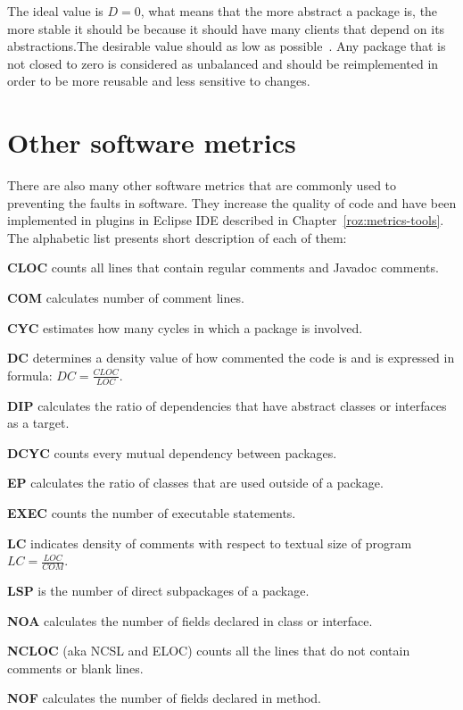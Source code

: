 The ideal value is $D=0$, what means that the more abstract a package is, the more stable it should be because it should have many clients that depend on its abstractions.The desirable value should as low as possible~\cite{martin}. Any package that is not closed to zero is considered as unbalanced and should be reimplemented in order to be more reusable and less sensitive to changes.

\section{Other software metrics}
\label{sec:other-metrics}
There are also many other software metrics that are commonly used to preventing the faults in software. They increase the quality of code and have been implemented in plugins in Eclipse IDE described in Chapter~\ref{roz:metrics-tools}. The alphabetic list presents short description of each of them:  

\textbf{\ac{CLOC}} counts all lines that contain regular comments and Javadoc comments.

\textbf{\ac{COM}} calculates number of comment lines. 

\textbf{\ac{CYC}} estimates how many cycles in which a package is involved.

\textbf{\ac{DC}} determines a density value of how commented the code is and is expressed in formula: $DC = \frac{CLOC}{LOC}$.

\textbf{\ac{DIP}}  calculates the ratio of dependencies that have abstract classes or interfaces as a target.

\textbf{\ac{DCYC}} counts every mutual dependency between packages.

\textbf{\ac{EP}}  calculates the ratio of classes that are used outside of a package.

\textbf{\ac{EXEC}} counts the number of executable statements.	

\textbf{\ac{LC}} indicates density of comments with respect to textual size of program $LC=\frac {LOC}{COM}$.

\textbf{\ac{LSP}} is the number of direct subpackages of a package.

\textbf{\ac{NOA}}  calculates the number of fields declared in class or interface.

\textbf{\ac{NCLOC}} (aka NCSL and ELOC) counts all the lines that do not contain comments or blank lines.

\textbf{\ac{NOF}}  calculates the number of fields declared in method.

